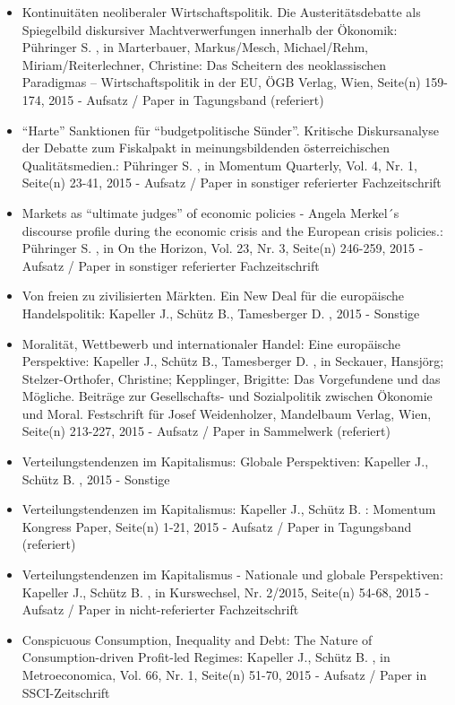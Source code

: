 \begin{itemize}
	 \item Kontinuitäten neoliberaler Wirtschaftspolitik. Die Austeritätsdebatte als Spiegelbild diskursiver Machtverwerfungen innerhalb der Ökonomik: Pühringer S. , in Marterbauer, Markus/Mesch, Michael/Rehm, Miriam/Reiterlechner, Christine: Das Scheitern des neoklassischen Paradigmas – Wirtschaftspolitik in der EU, ÖGB Verlag, Wien, Seite(n) 159-174, 2015 - Aufsatz / Paper in Tagungsband (referiert)
	 \item “Harte” Sanktionen für “budgetpolitische Sünder”. Kritische Diskursanalyse der Debatte zum Fiskalpakt in meinungsbildenden österreichischen Qualitätsmedien.: Pühringer S. , in Momentum Quarterly, Vol. 4, Nr. 1, Seite(n) 23-41, 2015 - Aufsatz / Paper in sonstiger referierter Fachzeitschrift
	 \item Markets as “ultimate judges” of economic policies - Angela Merkel´s discourse profile during the economic crisis and the European crisis policies.: Pühringer S. , in On the Horizon, Vol. 23, Nr. 3, Seite(n) 246-259, 2015 - Aufsatz / Paper in sonstiger referierter Fachzeitschrift
	 \item Von freien zu zivilisierten Märkten. Ein New Deal für die europäische Handelspolitik: Kapeller J., Schütz B., Tamesberger D. , 2015 - Sonstige
	 \item Moralität, Wettbewerb und internationaler Handel: Eine europäische Perspektive: Kapeller J., Schütz B., Tamesberger D. , in Seckauer, Hansjörg; Stelzer-Orthofer, Christine; Kepplinger, Brigitte: Das Vorgefundene und das Mögliche. Beiträge zur Gesellschafts- und Sozialpolitik zwischen Ökonomie und Moral. Festschrift für Josef Weidenholzer, Mandelbaum Verlag, Wien, Seite(n) 213-227, 2015 - Aufsatz / Paper in Sammelwerk (referiert)
	 \item Verteilungstendenzen im Kapitalismus: Globale Perspektiven: Kapeller J., Schütz B. , 2015 - Sonstige
	 \item Verteilungstendenzen im Kapitalismus: Kapeller J., Schütz B. : Momentum Kongress Paper, Seite(n) 1-21, 2015 - Aufsatz / Paper in Tagungsband (referiert)
	 \item Verteilungstendenzen im Kapitalismus - Nationale und globale Perspektiven: Kapeller J., Schütz B. , in Kurswechsel, Nr. 2/2015, Seite(n) 54-68, 2015 - Aufsatz / Paper in nicht-referierter Fachzeitschrift
	 \item Conspicuous Consumption, Inequality and Debt: The Nature of Consumption-driven Profit-led Regimes: Kapeller J., Schütz B. , in Metroeconomica, Vol. 66, Nr. 1, Seite(n) 51-70, 2015 - Aufsatz / Paper in SSCI-Zeitschrift

\end{itemize}
